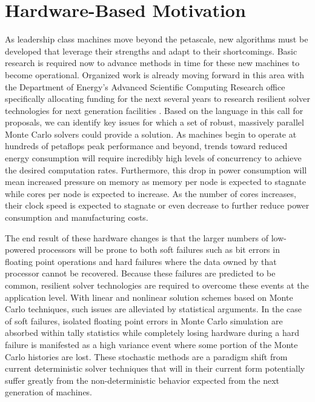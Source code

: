 \section{Hardware-Based Motivation}
\label{sec:hardware_motivation}
As leadership class machines move beyond the petascale, new algorithms
must be developed that leverage their strengths and adapt to their
shortcomings. Basic research is required now to advance methods in
time for these new machines to become operational. Organized work is
already moving forward in this area with the Department of Energy's
Advanced Scientific Computing Research office specifically allocating
funding for the next several years to research resilient solver
technologies for next generation facilities
\cite{u.s._department_of_energy_resilient_2012}. Based on the language
in this call for proposals, we can identify key issues for which a set
of robust, massively parallel Monte Carlo solvers could provide a
solution. As machines begin to operate at hundreds of petaflops peak
performance and beyond, trends toward reduced energy consumption will
require incredibly high levels of concurrency to achieve the desired
computation rates. Furthermore, this drop in power consumption will
mean increased pressure on memory as memory per node is expected to
stagnate while cores per node is expected to increase. As the number
of cores increases, their clock speed is expected to stagnate or even
decrease to further reduce power consumption and manufacturing costs.

The end result of these hardware changes is that the larger numbers of
low-powered processors will be prone to both soft failures such as bit
errors in floating point operations and hard failures where the data
owned by that processor cannot be recovered. Because these failures
are predicted to be common, resilient solver technologies are required
to overcome these events at the application level. With linear and
nonlinear solution schemes based on Monte Carlo techniques, such
issues are alleviated by statistical arguments. In the case of soft
failures, isolated floating point errors in Monte Carlo simulation are
absorbed within tally statistics while completely losing hardware
during a hard failure is manifested as a high variance event where
some portion of the Monte Carlo histories are lost. These stochastic
methods are a paradigm shift from current deterministic solver
techniques that will in their current form potentially suffer greatly
from the non-deterministic behavior expected from the next generation
of machines.

